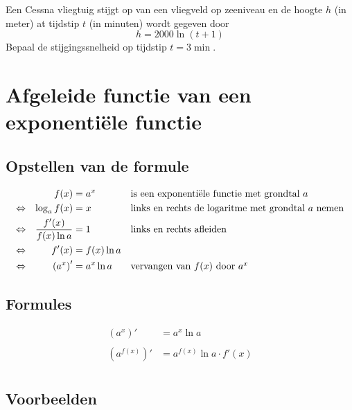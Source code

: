 \documentclass[12pt,twoside,a4paper]{article}
\begin{document}
\begin{oefening}
Een Cessna vliegtuig stijgt op van een vliegveld op zeeniveau en de hoogte $h$ (in meter) at tijdstip $t$ (in minuten) wordt gegeven door
$$h=2000 \ln(t+1)$$
Bepaal de stijgingssnelheid op tijdstip $t=3\min$.
\end{oefening}
\vspace*{-1cm}

\cleardoublepage
\section{Afgeleide functie van een exponentiële functie}

\subsection{Opstellen van de formule}

\begin{align*}
       &  & f(x)                     & = a^x       &  & \mbox{is een exponentiële functie met grondtal $a$}        \\
  \Leftrightarrow &  & \log_a f(x)              & = x         &  & \mbox{links en rechts de logaritme met grondtal $a$ nemen} \\
  \Leftrightarrow &  & \dfrac{f'(x)}{f(x)\ln a} & = 1         &  & \mbox{links en rechts afleiden}                            \\
  \Leftrightarrow &  & f'(x)                    & = f(x)\ln a                                                                 \\
  \Leftrightarrow &  & \left(a^x\right)'        & = a^x \ln a &  & \mbox{vervangen van $f(x)$ door $a^x$}
\end{align*}

\subsection{Formules}

\begin{align*}
  \left(a^x\right)' &= a^x \ln a\\\\
  \left(a^{f(x)}\right)' &= a^{f(x)} \ln a \cdot f'(x)\\
\end{align*}

\subsection{Voorbeelden}
\end{document}
